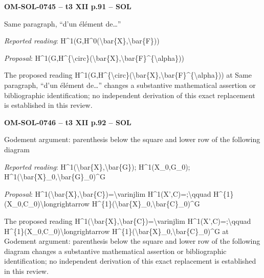 \par\noindent\textbf{OM-SOL-0745 -- t3 XII p.91 -- SOL}\par
Same paragraph, “d'un élément de…”\par
\emph{Reported reading}: H\textasciicircum{}1(G,H\textasciicircum{}0(\textbackslash{}bar\{X\},\textbackslash{}bar\{F\}))\par
\emph{Proposal}: H\textasciicircum{}1(G,H\textasciicircum{}\{\textbackslash{}circ\}(\textbackslash{}bar\{X\},\textbackslash{}bar\{F\}\textasciicircum{}\{\textbackslash{}alpha\}))\par
The proposed reading H\textasciicircum{}1(G,H\textasciicircum{}\{\textbackslash{}circ\}(\textbackslash{}bar\{X\},\textbackslash{}bar\{F\}\textasciicircum{}\{\textbackslash{}alpha\})) at Same paragraph, “d'un élément de…” changes a substantive mathematical assertion or bibliographic identification; no independent derivation of this exact replacement is established in this review.\par
\par\noindent\textbf{OM-SOL-0746 -- t3 XII p.92 -- SOL}\par
Godement argument: parenthesis below the square and lower row of the following diagram\par
\emph{Reported reading}: H\textasciicircum{}1(\textbackslash{}bar\{X\},\textbackslash{}bar\{G\}); H\textasciicircum{}1(X\_0,G\_0); H\textasciicircum{}1(\textbackslash{}bar\{X\}\_0,\textbackslash{}bar\{G\}\_0)\textasciicircum{}G\par
\emph{Proposal}: H\textasciicircum{}1(\textbackslash{}bar\{X\},\textbackslash{}bar\{C\})=\allowbreak \textbackslash{}varinjlim H\textasciicircum{}1(X',C)=;\textbackslash{}qquad H\textasciicircum{}\{1\}(X\_0,C\_0)\textbackslash{}longrightarrow H\textasciicircum{}\{1\}(\textbackslash{}bar\{X\}\_0,\textbackslash{}bar\{C\}\_0)\textasciicircum{}G\par
The proposed reading H\textasciicircum{}1(\textbackslash{}bar\{X\},\textbackslash{}bar\{C\})=\allowbreak \textbackslash{}varinjlim H\textasciicircum{}1(X',C)=;\textbackslash{}qquad H\textasciicircum{}\{1\}(X\_0,C\_0)\textbackslash{}longrightarrow H\textasciicircum{}\{1\}(\textbackslash{}bar\{X\}\_0,\textbackslash{}bar\{C\}\_0)\textasciicircum{}G at Godement argument: parenthesis below the square and lower row of the following diagram changes a substantive mathematical assertion or bibliographic identification; no independent derivation of this exact replacement is established in this review.\par
